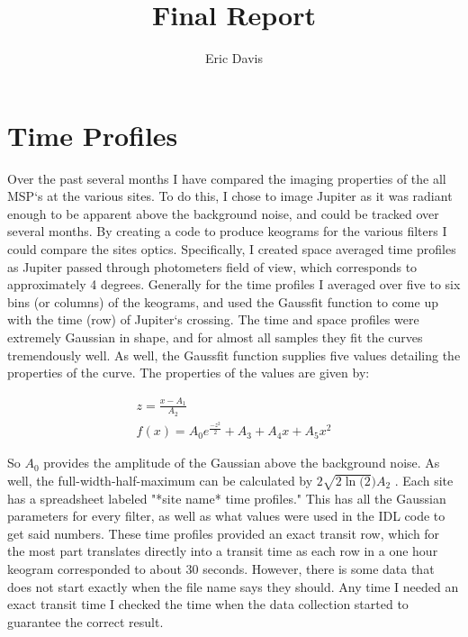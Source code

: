 \documentclass[11pt]{article}
\title{Final Report}
\author{Eric Davis}
\begin{document}
\maketitle
\medskip



\section{Time Profiles}
\hspace{0.5cm}

Over the past several months I have compared the imaging properties of the all MSP`s at the various sites. To do this, I chose to image Jupiter as it was radiant enough to be apparent above the background noise, and could be tracked over several months. By creating a code to produce keograms for the various filters I could compare the sites optics. Specifically, I created space averaged time profiles as Jupiter passed through photometers field of view, which corresponds to approximately 4 degrees. Generally for the time profiles I averaged over five to six bins (or columns) of the keograms, and used the Gaussfit function to come up with the time (row) of Jupiter`s crossing. The time and space profiles were extremely Gaussian in shape, and for almost all samples they fit the curves tremendously well.  As well, the Gaussfit function supplies five values detailing the properties of the curve. The properties of the values are given by:

\begin{eqnarray}
z=\frac{x-A_1}{A_2}  \\
f(x)=A_0e^\frac{-z^2}{2}+A_3+A_4x+A_5x^2
\end{eqnarray}

So $A_0$ provides the amplitude of the Gaussian above the background noise. As well, the full-width-half-maximum can be calculated by $2\sqrt{2\ln(2})A_2$ .  Each site has a spreadsheet labeled "*site name* time profiles." This has all the Gaussian parameters for every filter, as well as what values were used in the IDL code to get said numbers. These time profiles provided an exact transit row, which for the most part translates directly into a transit time as each row in a one hour keogram corresponded to about 30 seconds. However, there is some data that does not start exactly when the file name says they should. Any time I needed an exact transit time I checked the time when the data collection started to guarantee the correct result. 
\end{document}
